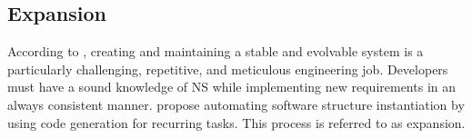 \subsection{Expansion} \label{subsec_expansion}

According to \textcite[403]{mannaert_normalized_2016}, creating and maintaining a stable
and evolvable system is a particularly challenging, repetitive, and meticulous engineering
job. Developers must have a sound knowledge of NS while implementing new requirements in
an always consistent manner. \textcite[403]{mannaert_normalized_2016} propose automating
software structure instantiation by using code generation for recurring tasks. This
process is referred to as expansion.

